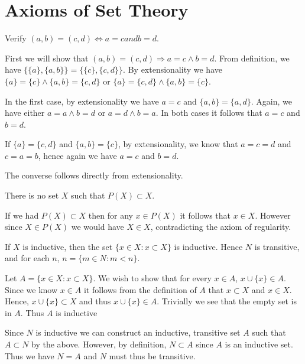 \section{Axioms of Set Theory}

\begin{problem}
  Verify $(a, b) = (c, d) \Leftrightarrow a = c and b = d$.
\end{problem}

\begin{solution}
  First we will show that $(a, b) = (c, d) \Rightarrow a = c \wedge b = d$.
  From definition, we have $\{\{a\}, \{a, b\}\} = \{\{c\}, \{c, d\}\}$.
  By extensionality we have $\{a\} = \{c\} \wedge \{a, b\} = \{c, d\}$ or $\{a\} = \{c, d\} \wedge \{a, b\} = \{c\}$.

  In the first case, by extensionality we have $a = c$ and $\{a, b\} = \{a, d\}$.
  Again, we have either $a = a \wedge b = d$ or $a = d \wedge b = a$.
  In both cases it follows that $a = c$ and $b = d$.

  If $\{a\} = \{c, d\}$ and $\{a, b\} = \{c\}$, by extensionality, we know that $a = c = d$ and $c = a = b$, hence again we have $a = c$ and $b = d$.

  The converse follows directly from extensionality.
\end{solution}

\begin{problem}
  There is no set $X$ such that $P(X) \subset X$.
\end{problem}

\begin{solution}
  If we had $P(X) \subset X$ then for any $x \in P(X)$ it follows that $x \in X$.
  However since $X \in P(X)$ we would have $X \in X$, contradicting the axiom of regularity.
\end{solution}

\begin{problem}
  If $X$ is inductive, then the set $\{x \in X : x \subset X\}$ is inductive.
  Hence $N$ is transitive, and for each $n$, $n = \{m \in N : m < n\}$.
\end{problem}

\begin{solution}
  Let $A = \{x \in X : x \subset X\}$.
  We wish to show that for every $x \in A$, $x \cup \{x\} \in A$.
  Since we know $x \in A$ it follows from the definition of $A$ that $x \subset X$ and $x \in X$.
  Hence, $x \cup \{x\} \subset X$ and thus $x \cup \{x\} \in A$.
  Trivially we see that the empty set is in $A$.
  Thus $A$ is inductive

  Since $N$ is inductive we can construct an inductive, transitive set $A$ such that $A \subset N$ by the above.
  However, by definition, $N \subset A$ since $A$ is an inductive set.
  Thus we have $N = A$ and $N$ must thus be transitive.
\end{solution}

